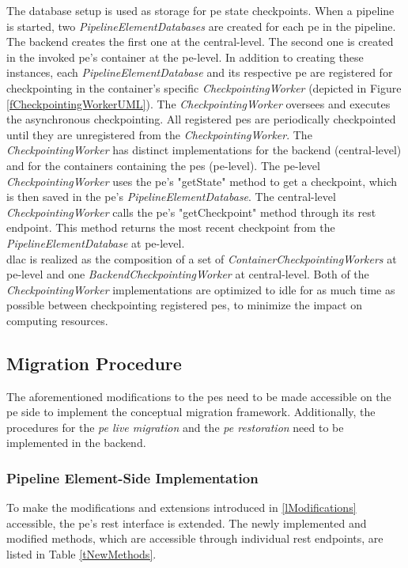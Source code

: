 The database setup is used as storage for \gls{pe} state checkpoints. When a pipeline is started, two \textit{PipelineElementDatabases} are created for each \gls{pe} in the pipeline. The backend creates the first one at the central-level. The second one is created in the invoked \gls{pe}'s container at the \gls{pe}-level. In addition to creating these instances, each \textit{PipelineElementDatabase} and its respective \gls{pe} are registered for checkpointing in the container’s specific \textit{CheckpointingWorker} (depicted in Figure \ref{fCheckpointingWorkerUML}). The \textit{CheckpointingWorker} oversees and executes the asynchronous checkpointing. All registered \gls{pe}s are periodically checkpointed until they are unregistered from the \textit{CheckpointingWorker}. The \textit{CheckpointingWorker} has distinct implementations for the backend (central-level) and for the containers containing the \gls{pe}s (\gls{pe}-level). The \gls{pe}-level \textit{CheckpointingWorker} uses the \gls{pe}'s "getState" method to get a checkpoint, which is then saved in the \gls{pe}'s \textit{PipelineElementDatabase}. The central-level \textit{CheckpointingWorker} calls the \gls{pe}'s "getCheckpoint" method through its \gls{rest} endpoint. This method returns the most recent checkpoint from the \textit{PipelineElementDatabase} at \gls{pe}-level.\\
\gls{dlac} is realized as the composition of a set of \textit{ContainerCheckpointingWorkers} at \gls{pe}-level and one \textit{BackendCheckpointingWorker} at central-level. Both of the \textit{CheckpointingWorker} implementations are optimized to idle for as much time as possible between checkpointing registered \gls{pe}s, to minimize the impact on computing resources.\par





\subsection{Migration Procedure}
\label{lImplementationMigrationProcedure}
The aforementioned modifications to the \gls{pe}s need to be made accessible on the \gls{pe} side to implement the conceptual migration framework. Additionally, the procedures for the \textit{\acrshort{pe} live migration} and the \textit{\acrshort{pe} restoration} need to be implemented in the backend.\par

\subsubsection{Pipeline Element-Side Implementation}
\label{lOperatorSideImplementation}
To make the modifications and extensions introduced in \ref{lModifications} accessible, the \gls{pe}'s \gls{rest} interface is extended. The newly implemented and modified methods, which are accessible through individual \gls{rest} endpoints, are listed in Table \ref{tNewMethods}.



